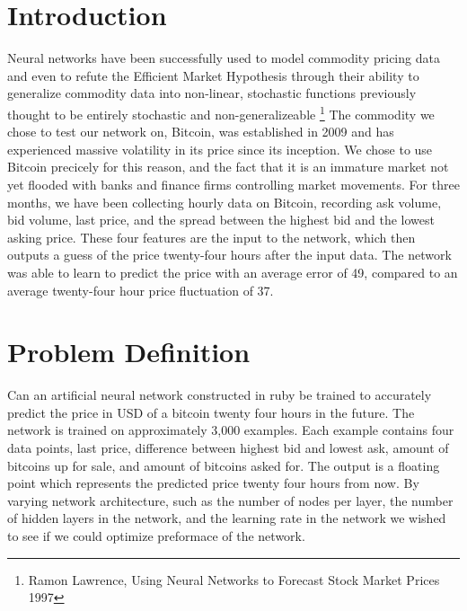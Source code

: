 \documentclass[a4paper,11pt]{article}
\begin{document}
\section{Introduction}
Neural networks have been successfully used to
model commodity pricing data and even to refute the Efficient Market Hypothesis
through their ability to generalize commodity data into non-linear, 
stochastic functions previously thought to be entirely stochastic and non-generalizeable
\footnote{Ramon Lawrence, Using Neural Networks to Forecast Stock Market Prices 1997}
The commodity we chose to test our network on, Bitcoin, was established in 2009 and has 
experienced massive volatility in its price since its inception.  We chose to use Bitcoin 
precicely for this reason, and the fact that it is an immature market not yet flooded with
banks and finance firms controlling market movements.
\newline \newline
For three months, we have been collecting hourly data on Bitcoin, recording
ask volume, bid volume, last price, and the spread between the highest bid and the lowest asking price.
These four features are the input to the network, which then outputs a guess of the price twenty-four
hours after the input data.  The network was able to learn to predict the price with an average error
of 49\cent, compared to an average twenty-four hour price fluctuation of 37\cent. 

\section{Problem Definition}
Can an artificial neural network constructed in ruby be trained to accurately predict the price in USD
of a bitcoin twenty four hours in the future.  The network is trained on approximately 3,000 examples.
Each example contains four data points, last price, difference between highest bid and lowest ask,
amount of bitcoins up for sale, and amount of bitcoins asked for.  The output is a floating point which
represents the predicted price twenty four hours from now. By varying network architecture, such as the number of nodes per layer, the number of hidden layers in the network, and the learning rate in the network we wished to see if we could optimize preformace of the network. 
\end{document}
